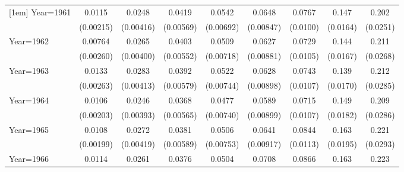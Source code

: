 \begin{table}[htbp]
\begin{tabular}{l*{8}{c}}
[1em]
Year=1961           &      0.0115\sym{***}&      0.0248\sym{***}&      0.0419\sym{***}&      0.0542\sym{***}&      0.0648\sym{***}&      0.0767\sym{***}&       0.147\sym{***}&       0.202\sym{***}\\
                    &   (0.00215)         &   (0.00416)         &   (0.00569)         &   (0.00692)         &   (0.00847)         &    (0.0100)         &    (0.0164)         &    (0.0251)         \\
[1em]
Year=1962           &     0.00764\sym{***}&      0.0265\sym{***}&      0.0403\sym{***}&      0.0509\sym{***}&      0.0627\sym{***}&      0.0729\sym{***}&       0.144\sym{***}&       0.211\sym{***}\\
                    &   (0.00260)         &   (0.00400)         &   (0.00552)         &   (0.00718)         &   (0.00881)         &    (0.0105)         &    (0.0167)         &    (0.0268)         \\
[1em]
Year=1963           &      0.0133\sym{***}&      0.0283\sym{***}&      0.0392\sym{***}&      0.0522\sym{***}&      0.0628\sym{***}&      0.0743\sym{***}&       0.139\sym{***}&       0.212\sym{***}\\
                    &   (0.00263)         &   (0.00413)         &   (0.00579)         &   (0.00744)         &   (0.00898)         &    (0.0107)         &    (0.0170)         &    (0.0285)         \\
[1em]
Year=1964           &      0.0106\sym{***}&      0.0246\sym{***}&      0.0368\sym{***}&      0.0477\sym{***}&      0.0589\sym{***}&      0.0715\sym{***}&       0.149\sym{***}&       0.209\sym{***}\\
                    &   (0.00203)         &   (0.00393)         &   (0.00565)         &   (0.00740)         &   (0.00899)         &    (0.0107)         &    (0.0182)         &    (0.0286)         \\
[1em]
Year=1965           &      0.0108\sym{***}&      0.0272\sym{***}&      0.0381\sym{***}&      0.0506\sym{***}&      0.0641\sym{***}&      0.0844\sym{***}&       0.163\sym{***}&       0.221\sym{***}\\
                    &   (0.00199)         &   (0.00419)         &   (0.00589)         &   (0.00753)         &   (0.00917)         &    (0.0113)         &    (0.0195)         &    (0.0293)         \\
[1em]
Year=1966           &      0.0114\sym{***}&      0.0261\sym{***}&      0.0376\sym{***}&      0.0504\sym{***}&      0.0708\sym{***}&      0.0866\sym{***}&       0.163\sym{***}&       0.223\sym{***}\\

\end{tabular}
\end{table}
